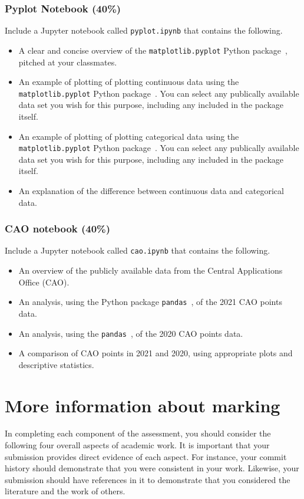 \documentclass[a4paper, 12pt]{scrartcl}
\begin{document}
  \subsubsection*{Pyplot Notebook (40\%)}
  Include a Jupyter notebook called \texttt{pyplot.ipynb} that contains the following.
  \begin{itemize}
    \item A clear and concise overview of the \texttt{matplotlib.pyplot} Python package~\cite{pyplot}, pitched at your classmates.
    \item An example of plotting of plotting continuous data using the \texttt{matplotlib.pyplot} Python package~\cite{pyplot}. You can select any publically available data set you wish for this purpose, including any included in the package itself.
    \item An example of plotting of plotting categorical data using the \texttt{matplotlib.pyplot} Python package~\cite{pyplot}. You can select any publically available data set you wish for this purpose, including any included in the package itself.
    \item An explanation of the difference between continuous data and categorical data.
  \end{itemize}

  \subsubsection*{CAO notebook (40\%)}
  Include a Jupyter notebook called \texttt{cao.ipynb} that contains the following.
  \begin{itemize}
    \item An overview of the publicly available data from the Central Applications Office (CAO).
    \item An analysis, using the Python package \texttt{pandas}~\cite{pandas}, of the 2021 CAO points data.
    \item An analysis, using the \texttt{pandas}~\cite{pandas}, of the 2020 CAO points data.
    \item A comparison of CAO points in 2021 and 2020, using appropriate plots and descriptive statistics.
  \end{itemize}

  \section*{More information about marking}
    In completing each component of the assessment, you should consider the following four overall aspects of academic work.
    It is important that your submission provides direct evidence of each aspect.
    For instance, your commit history should demonstrate that you were consistent in your work.
    Likewise, your submission should have references in it to demonstrate that you considered the literature and the work of others.
  
\end{document}
